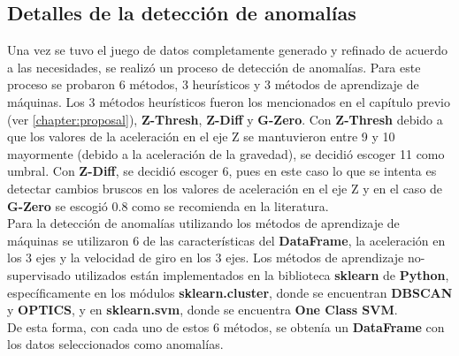 	\subsection{Detalles de la detección de anomalías}
		Una vez se tuvo el juego de datos completamente generado y refinado de acuerdo a las necesidades, se realizó un proceso de detección de anomalías.
		Para este proceso se probaron 6 métodos, 3 heurísticos y 3 métodos de aprendizaje de máquinas. Los 3 métodos heurísticos fueron los mencionados 
		en el capítulo previo (ver \ref{chapter:proposal}), \textbf{Z-Thresh}, \textbf{Z-Diff} y \textbf{G-Zero}. Con \textbf{Z-Thresh} debido a que 
		los valores de la aceleración en el eje Z se mantuvieron entre 9 y 10 mayormente (debido a la aceleración de la gravedad), se decidió escoger
		11 como umbral. Con \textbf{Z-Diff}, se decidió escoger 6, pues en este caso lo que se intenta es detectar cambios bruscos en los valores de
		aceleración en el eje Z y en el caso de \textbf{G-Zero} se escogió 0.8 como se recomienda en la literatura.\\
		\indent Para la detección de anomalías utilizando los métodos de aprendizaje de máquinas se utilizaron 6 de las características del \textbf
		{DataFrame}, la aceleración en los 3 ejes y la velocidad de giro en los 3 ejes. Los métodos de aprendizaje no-supervisado utilizados están
		implementados en la biblioteca \textbf{sklearn} de \textbf{Python}, específicamente en los módulos \textbf{sklearn.cluster}, donde se encuentran
		\textbf{DBSCAN} y \textbf{OPTICS}, y en \textbf{sklearn.svm}, donde se encuentra \textbf{One Class SVM}.\\
		\indent De esta forma, con cada uno de estos 6 métodos, se obtenía un \textbf{DataFrame} con los datos seleccionados como anomalías.

